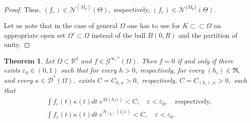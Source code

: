 \documentclass[sn-mathphys,Numbered]{sn-jnl}%
\theoremstyle{thmstyleone}%
\newtheorem{theorem}{Theorem}%
\theoremstyle{thmstyletwo}%
\theoremstyle{thmstylethree}%
\begin{document}
\begin{proof}
Thus, $(f_\varepsilon)\in \mathcal{N}^{(M_p)}(\Theta),$ respectively, $(f_\varepsilon)\in \mathcal{N}^{\{M_p\}}(\Theta)$. 

Let us note that in the case of general $\Omega$ one has to use for $K\subset\subset\Omega$ an appropriate open set $\Omega'\subset\Omega$ instead of the ball $B(0,R)$ and  the  partition of unity.  
\end{proof}







\begin{theorem}\label{4-2}
Let $\Omega\subset \mathbb{R}^d$ and $f\in \mathcal{G}^{\infty,\ast}(\Omega).$ Then $f=0$ if and only if 
there exists $\varepsilon_0\in (0,1)$ such that for every $h>0$, respectively, for every $(h_i)\in\mathfrak{R},$ and every $\kappa\in \mathcal{D}^\ast(\Omega),$ exists $C=C_{h,\kappa}>0,$ respectively, $C=C_{(h_i),\kappa}>0,$ such that
\begin{align}\label{ops*}
&\int f_\varepsilon(t)\kappa(t)dt\; e^{M(h/\varepsilon)}<C,\quad \varepsilon<\varepsilon_0,\quad %
\text{respectively,}\\ \nonumber
&\int f_\varepsilon(t)\kappa(t)dt \;e^{N_{(h_i)}(1/\varepsilon)}<C,\quad \varepsilon<\varepsilon_0.
\end{align}

\end{theorem}
\end{document}

